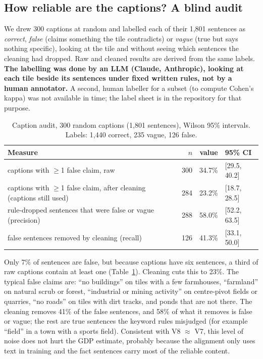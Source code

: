 \documentclass[11pt,a4paper]{article}
\begin{document}
\subsection{How reliable are the captions? A blind audit}

We drew 300 captions at random and labelled each of their 1{,}801 sentences as \emph{correct}, \emph{false} (claims
something the tile contradicts) or \emph{vague} (true but says nothing specific), looking at the tile and without
seeing which sentences the cleaning had dropped. Raw and cleaned results are derived from the same labels.
\textbf{The labelling was done by an LLM (Claude, Anthropic), looking at each tile beside its sentences under fixed
written rules, not by a human annotator.} A second, human labeller for a subset (to compute Cohen's kappa) was not
available in time; the label sheet is in the repository for that purpose.

\begin{table}[!htbp]
\centering\small
\caption{Caption audit, 300 random captions (1{,}801 sentences), Wilson 95\% intervals. Labels: 1{,}440 correct, 235
vague, 126 false.}
\label{tab:audit}
\begin{tabular}{@{}lrrl@{}}
\toprule
Measure & $n$ & value & 95\% CI \\
\midrule
captions with $\geq$1 false claim, raw & 300 & 34.7\% & [29.5, 40.2] \\
captions with $\geq$1 false claim, after cleaning (captions still used) & 284 & 23.2\% & [18.7, 28.5] \\
rule-dropped sentences that were false or vague (precision) & 288 & 58.0\% & [52.2, 63.5] \\
false sentences removed by cleaning (recall) & 126 & 41.3\% & [33.1, 50.0] \\
\bottomrule
\end{tabular}
\end{table}

Only 7\% of sentences are false, but because captions have six sentences, a third of raw captions contain at least
one (Table~\ref{tab:audit}). Cleaning cuts this to 23\%. The typical false claims are: ``no buildings'' on tiles with
a few farmhouses, ``farmland'' on natural scrub or forest, ``industrial or mining activity'' on centre-pivot fields or
quarries, ``no roads'' on tiles with dirt tracks, and ponds that are not there. The cleaning removes 41\% of the false
sentences, and 58\% of what it removes is false or vague; the rest are true sentences the keyword rules
misjudged (for example ``field'' in a town with a sports field). Consistent with V8 $\approx$ V7, this level of noise
does not hurt the GDP estimate, probably because the alignment only uses text in training and the fact sentences
carry most of the reliable content.
\end{document}
